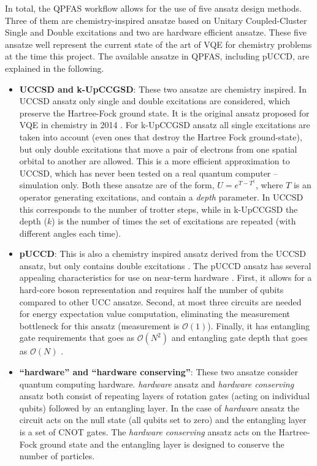 \documentclass[journal,onecolumn]{IEEEtran}
\begin{document}
In total, the QPFAS workflow allows for the use of five ansatz design methods.
%
Three of them are chemistry-inspired ansatze based on Unitary Coupled-Cluster Single and Double excitations and two are hardware efficient ansatze.
These five ansatze well represent the current state of the art of VQE for chemistry problems at the time this project.
%
The available ansatze in QPFAS, including pUCCD, are explained in the following.
%
\begin{itemize}
    \item \textbf{UCCSD and k-UpCCGSD}: These two ansatze are chemistry inspired. 
    In UCCSD ansatz only single and double excitations are considered, which preserve the Hartree-Fock ground state. 
    It is the original ansatz proposed for VQE in chemistry in 2014 \cite{peruzzo2014variational}. 
    For k-UpCCGSD ansatz all single excitations are taken into account (even ones that destroy the Hartree Fock ground-state), but only double excitations that move a pair of electrons from one spatial orbital to another are allowed. 
    This is a more efficient approximation to UCCSD, which has never been tested on a real quantum computer -- simulation only.
    Both these ansatze are of the form, $U=e^{T-T^\dagger}$, where $T$ is an operator generating excitations, and contain a \textit{depth} parameter. In UCCSD this corresponds to the number of trotter steps, while in k-UpCCGSD the depth ($k$) is the number of times the set of excitations are repeated (with different angles each time).
    
    \item \textbf{pUCCD}: This is also a chemistry inspired ansatz derived from the UCCSD ansatz, but only contains double excitations \cite{Elfving2020-xf, Elfving2020-zx}. 
    The pUCCD ansatz has several appealing characteristics for use on near-term hardware \cite{OBrien2022-aa}.
    First, it allows for a hard-core boson representation and requires half the number of qubits compared to other UCC ansatze. 
    Second, at most three circuits are needed for energy expectation value computation, eliminating the measurement bottleneck for this ansatz (measurement is $\mathcal{O}(1)$). 
    Finally, it has entangling gate requirements that goes as $\mathcal{O}(N^2)$ and entangling gate depth that goes as $\mathcal{O}(N)$ \cite{Zhao2023-um}.


    \item \textbf{``hardware'' and ``hardware conserving''}: These two ansatze consider quantum computing hardware. \textit{hardware} ansatz \cite{kandala2017hardware} and \textit{hardware conserving} ansatz \cite{barkoutsos2018quantum} both consist of repeating layers of rotation gates (acting on individual qubits) followed by an entangling layer.
    In the case of \textit{hardware} ansatz the circuit acts on the null state (all qubits set to zero) and the entangling layer is a set of CNOT gates. 
    The \textit{hardware conserving} ansatz acts on the Hartree-Fock ground state and the entangling layer is designed to conserve the number of particles.
\end{itemize}
\end{document}
